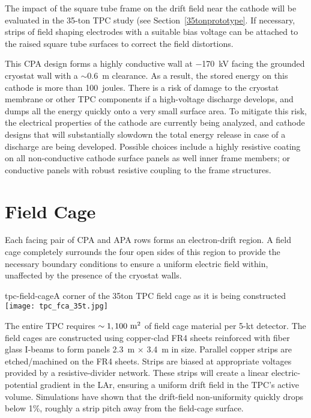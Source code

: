 The impact of the square tube frame on the drift field near the cathode will be evaluated in the 35-ton TPC study (see Section~\ref{35tonprototype}.  If necessary, strips of field shaping electrodes with a suitable bias voltage can be attached to the raised square tube surfaces to correct the field distortions.  

This CPA design forms a highly conductive wall at $-$170~kV facing the grounded cryostat wall with a $\sim$0.6~m clearance.  As a result, the stored energy on this cathode is more than 100~joules.  There is a risk of damage to the cryostat membrane or other TPC components if a high-voltage discharge develops, and dumps all the energy quickly onto a very small surface area. To mitigate this risk,  the electrical properties of the cathode are currently being analyzed, and cathode designs that will substantially slowdown the total energy release in case of a discharge are being developed.  Possible choices include a highly resistive coating on all non-conductive cathode surface panels as well inner frame members; or conductive panels with robust resistive coupling to the frame structures.




\section{Field Cage}
\label{subsec:v5-tpc-chamber-fieldcage}

Each facing pair of CPA and APA rows forms an electron-drift region. A field cage  completely surrounds the four open sides of this region
to provide the necessary boundary conditions to ensure a uniform electric field within, unaffected by the presence of the cryostat walls.


\begin{cdrfigure}{tpc-field-cage}{A corner of the 35ton TPC field cage as it is being constructed}
\texttt{[image: tpc\_fca\_35t.jpg]}
\end{cdrfigure}


The entire TPC requires $\sim1,100~\rm{m}^2$ of field 
cage material per 5-kt detector. The field cages are constructed using copper-clad FR4 sheets reinforced with fiber glass I-beams to form panels 2.3~m $\times$ 3.4~m in size. Parallel copper strips are etched/machined
on the FR4 sheets. Strips are 
biased at appropriate voltages provided by a resistive-divider network. These strips will create
a linear electric-potential gradient in the LAr, ensuring a uniform drift 
field in the TPC's active volume.  Simulations have shown that the drift-field non-uniformity quickly drops below 1\%, roughly 
a strip pitch away from the field-cage surface. 

